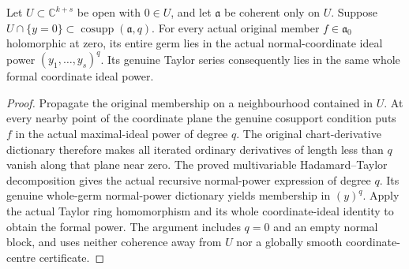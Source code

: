 \begin{theorem}
\label{hir:actual-local-coefficient-cosupport-normal-power}
\leanok
Let $U\subset\mathbb C^{k+s}$ be open with $0\in U$, and let
$\mathfrak a$ be coherent only on $U$. Suppose
$U\cap\{y=0\}\subset\operatorname{cosupp}(\mathfrak a,q)$.
For every actual original member $f\in\mathfrak a_0$ holomorphic at zero,
its entire germ lies in the actual normal-coordinate ideal power
$(y_1,\ldots,y_s)^q$. Its genuine Taylor series consequently lies in the
same whole formal coordinate ideal power.
\end{theorem}
\begin{proof}
Propagate the original membership on a neighbourhood contained in $U$.
At every nearby point of the coordinate plane the genuine cosupport
condition puts $f$ in the actual maximal-ideal power of degree $q$.
The original chart-derivative dictionary therefore makes all iterated
ordinary derivatives of length less than $q$ vanish along that plane near
zero. The proved multivariable Hadamard--Taylor decomposition gives the
actual recursive normal-power expression of degree $q$. Its genuine
whole-germ normal-power dictionary yields membership in $(y)^q$.
Apply the actual Taylor ring homomorphism and its whole coordinate-ideal
identity to obtain the formal power. The argument includes $q=0$ and an
empty normal block, and uses neither coherence away from $U$ nor a globally
smooth coordinate-centre certificate.
\end{proof}

